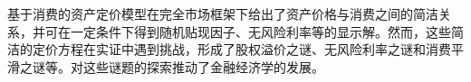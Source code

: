 

\begin{tcolorbox}[summary,title=本章小结]
基于消费的资产定价模型在完全市场框架下给出了资产价格与消费之间的简洁关系，并可在一定条件下得到随机贴现因子、无风险利率等的显示解。然而，这些简洁的定价方程在实证中遇到挑战，形成了股权溢价之谜、无风险利率之谜和消费平滑之谜等。对这些谜题的探索推动了金融经济学的发展。
\end{tcolorbox}




